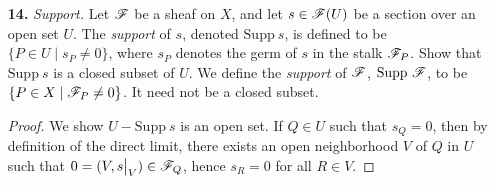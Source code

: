 \documentclass{article}
\begin{document}
\begin{enumerate} [label=\textbf{\arabic*.}, leftmargin=0em]
\begin{proof}
    Let $\fF$ be the presheaf $U \mapsto \varprojlim \fF_i(U)$. We have morphisms $\pi_{ij} : \fF_i \to \fF_j$ and $\pi_i : \fF \to \fF_i$ such that for all $i, j$, $\pi_j = \pi_{ij} \circ \pi_i$. If $U$ is an open set, if $\{V_\alpha \}$ is an open covering of $U$, then we have the exact sequence of abelian groups
    \[ \begin{tikzcd}
        0 \arrow[r] & {\Gamma(U, \fF_i)} \arrow[r] & {\prod_\alpha \Gamma(V_\alpha, \fF_i)} \arrow[r] & {\prod_{\alpha, \beta} \Gamma(V_\alpha \cap V_\beta, \fF_i)}
        \end{tikzcd} \]
    and direct limits commute with direct products, so the fact that $\fF$ is a sheaf follows from the exact sequence
    \[ \begin{tikzcd}
        0 \arrow[r] & {\varprojlim \Gamma(U, \fF_i)} \arrow[r] & {\prod_\alpha \varprojlim \Gamma(V_\alpha, \fF_i)} \arrow[r] & {\prod_{\alpha, \beta} \varprojlim \Gamma(V_\alpha \cap V_\beta, \fF_i)}.
        \end{tikzcd} \]
    To show $\fF$ is an inverse limit in a category-theoretic sense, if $\fG$ is some sheaf on $X$ with a collection of morphisms $\tau_i : \fG \to \fF_i$ such that $\tau_j = \pi_{ij} \circ \tau_i$ for all $i, j$, then we want to show there exists a unique $\theta : \fG \to \fF$ such that $\tau_i = \pi_i \circ \theta$. Since for each open subset $U$ in $X$ we have a direct system $\tau_i(U) : \Gamma(U, \fG) \to \Gamma(U, \fF_i)$, by the universal property of the inverse limit $\Gamma(U, \fF) = \varprojlim \Gamma(U, \fF_i)$, there exists a unique morphism $\theta(U) : \Gamma(U, \fG) \to \varprojlim \Gamma(U, \fF_i)$ such that $\tau_i(U) = \pi_i(U) \circ \theta(U)$, so we can define $\theta$ as such, then it is unique by construction.
\end{proof}

\item[\textbf{14.}] \textit{Support.} Let $\fF$ be a sheaf on $X$, and let $s \in \mathscr{F}(U)$ be a section over an open set $U$. The \textit{support} of $s$, denoted $\text{Supp}~s$, is defined to be $\{ P \in U \mid s_P \neq 0 \}$, where $s_P$ denotes the germ of $s$ in the stalk $\mathscr{F}_P$. Show that $\text{Supp}~s$ is a closed subset of $U$. We define the \textit{support} of $\fF$, $\text{Supp}~\mathscr{F}$, to be $\{P \in X \mid \mathscr{F}_P \neq 0 \}$. It need not be a closed subset.

\begin{proof}
    We show $U - \text{Supp}~s$ is an open set. If $Q \in U$ such that $s_Q = 0$, then by definition of the direct limit, there exists an open neighborhood $V$ of $Q$ in $U$ such that $0 = (V, \restr{s}{V}) \in \fF_Q$, hence $s_R = 0$ for all $R \in V$.
\end{proof}


\end{enumerate}
\end{document}
